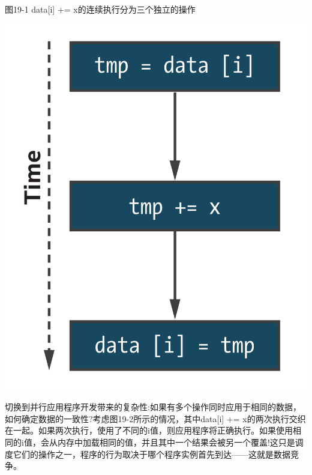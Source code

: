 \hspace*{\fill} \par %
图19-1 data[i] += x的连续执行分为三个独立的操作
\begin{center}
	\includegraphics[width=1.0\textwidth]{content/chapter-19/images/2}
\end{center}

切换到并行应用程序开发带来的复杂性:如果有多个操作同时应用于相同的数据，如何确定数据的一致性?考虑图19-2所示的情况，其中data[i] += x的两次执行交织在一起。如果两次执行，使用了不同的i值，则应用程序将正确执行。如果使用相同的i值，会从内存中加载相同的值，并且其中一个结果会被另一个覆盖!这只是调度它们的操作之一，程序的行为取决于哪个程序实例首先到达——这就是数据竞争。\par

